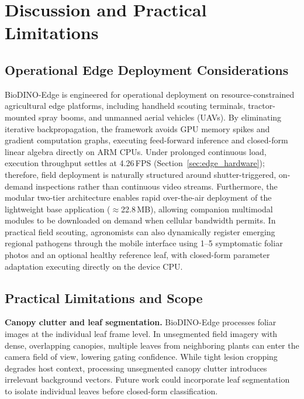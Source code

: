 \section{Discussion and Practical Limitations}
\label{sec:discussion}

\subsection{Operational Edge Deployment Considerations}
BioDINO-Edge is engineered for operational deployment on resource-constrained agricultural edge platforms, including handheld scouting terminals, tractor-mounted spray booms, and unmanned aerial vehicles (UAVs). By eliminating iterative backpropagation, the framework avoids GPU memory spikes and gradient computation graphs, executing feed-forward inference and closed-form linear algebra directly on ARM CPUs. Under prolonged continuous load, execution throughput settles at 4.26\,FPS (Section~\ref{sec:edge_hardware}); therefore, field deployment is naturally structured around shutter-triggered, on-demand inspections rather than continuous video streams. Furthermore, the modular two-tier architecture enables rapid over-the-air deployment of the lightweight base application ($\approx$22.8\,MB), allowing companion multimodal modules to be downloaded on demand when cellular bandwidth permits. In practical field scouting, agronomists can also dynamically register emerging regional pathogens through the mobile interface using 1--5 symptomatic foliar photos and an optional healthy reference leaf, with closed-form parameter adaptation executing directly on the device CPU.

\subsection{Practical Limitations and Scope}
\textbf{Canopy clutter and leaf segmentation.} BioDINO-Edge processes foliar images at the individual leaf frame level. In unsegmented field imagery with dense, overlapping canopies, multiple leaves from neighboring plants can enter the camera field of view, lowering gating confidence. While tight lesion cropping degrades host context, processing unsegmented canopy clutter introduces irrelevant background vectors. Future work could incorporate leaf segmentation to isolate individual leaves before closed-form classification.

